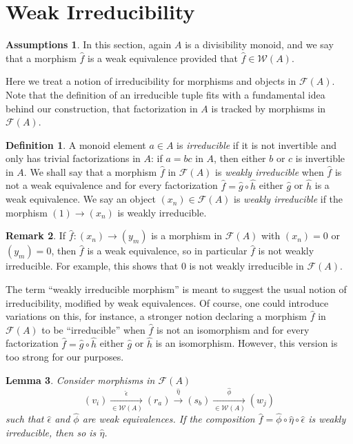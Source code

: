 \documentclass[reqno]{amsart}
\theoremstyle{plain}
\newtheorem{lem}{Lemma}[section]
\theoremstyle{definition}
\newtheorem{defn}[lem]{Definition}
\newtheorem{disc}[lem]{Remark}
\newtheorem*{assumptions}{Assumptions}
\newcommand{\cat}[1]{\mathcal{#1}}
\newcommand{\catw}{\cat{W}}
\newcommand{\catf}{\cat{F}}
\newcommand{\xra}{\xrightarrow}
\newcommand{\emptytuple}{\mathfrak{0}}
\numberwithin{equation}{lem}
\begin{document}
\section{Weak
Irreducibility}\label{sec170501a}

\begin{assumptions}
In this section, again  $A$ is a divisibility monoid,
and we say that a morphism $\hat f$ is a weak equivalence provided that $\hat f\in\catw(A)$.
\end{assumptions}


Here
we treat a notion of irreducibility  for morphisms and objects in $\catf(A)$.
Note that the definition of an irreducible tuple 
fits with a fundamental idea behind our construction, that factorization in $A$ is tracked by morphisms in $\catf(A)$.

\begin{defn}\label{defn170501e}
A monoid element $a\in A$ is \emph{irreducible} if it is not invertible and only has trivial factorizations in $A$: if $a=bc$ in $A$, then either $b$
or $c$ is invertible in $A$.
We shall say that a morphism $\hat{f}$ in $\mathcal{F}(A)$ is \textit{weakly irreducible} when $\hat{f}$ is not a weak equivalence and for every factorization 
$\hat{f} = \hat{g} \circ \hat{h}$ either $\hat{g}$ or $\hat{h}$ is a weak equivalence. 
We say an object $(x_n) \in \mathcal{F}(A)$ is 
\textit{weakly irreducible} 
if  the
morphism $(1) \to (x_n)$ is 
weakly
irreducible.
\end{defn}

\begin{disc}
\label{disc170501c}
If $\hat f\colon(x_n)\to(y_m)$ is a morphism in $\catf(A)$ with $(x_n)=\emptytuple$ or $(y_m)=\emptytuple$,
then  $\hat f$ is a weak equivalence, so in particular $\hat f$ is not 
weakly
irreducible. 
For example, this shows that $\emptytuple$ is not 
weakly irreducible  in $\catf(A)$.

The term ``weakly irreducible morphism'' is meant to suggest the usual notion of irreducibility,
modified by weak equivalences.
Of course, one could introduce variations on this,
for instance, a stronger notion declaring a morphism $\hat{f}$ in $\mathcal{F}(A)$ to be ``irreducible'' when $\hat{f}$ is not an isomorphism and for every factorization 
$\hat{f} = \hat{g} \circ \hat{h}$ either $\hat{g}$ or $\hat{h}$ is an isomorphism. 
However, this version is too strong for our purposes.
\end{disc}

\begin{lem}\label{lem190115a}
Consider morphisms in $\catf(A)$
$$(v_i)\xra[\in\catw(A)]{\hat\epsilon}(r_a)\xra{\hat{\eta}}(s_b)
\xra[\in\catw(A)]{\hat\phi}(w_j)$$ 
such that $\hat\epsilon$ and $\hat\phi$ are weak equivalences.
If the composition $\hat f=\hat\phi\circ\hat\eta\circ\hat\epsilon$
is weakly irreducible, then so is $\hat\eta$.
\end{lem}
\end{document}

